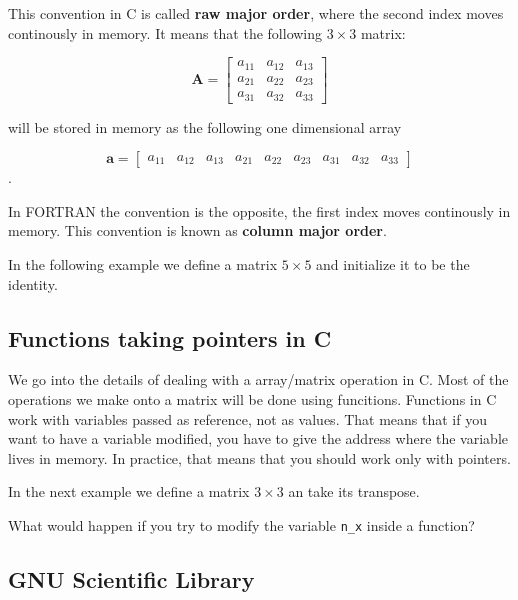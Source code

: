 \documentclass{article}
\begin{document}
This convention in C is called {\bf raw major order}, where the second index moves continously in memory. It means that the following $3\times 3$ matrix:


\begin{displaymath}
\mathbf{A} = 
\left[
\begin{array}{ccc}
a_{11}  & a_{12} & a_{13}   \\
a_{21}  & a_{22}   & a_{23}  \\
a_{31}  & a_{32} & a_{33}   
\end{array}
\right]
\end{displaymath}

will be stored in memory as the following one dimensional array

\begin{displaymath}
\mathbf{a} = 
\left[
\begin{array}{ccccccccc}
a_{11}  & a_{12} & a_{13}   & a_{21}  & a_{22}   & a_{23}  & a_{31}  & a_{32} & a_{33}   
\end{array}
\right]
\end{displaymath}.

In FORTRAN the convention is the opposite, the first index moves continously in memory. This convention is known as {\bf column major order}. 

In the following example we define a matrix $5\times 5$ and initialize it to be 
the identity.




\subsection{Functions taking pointers in C}
We go into the details of dealing with a array/matrix operation in C. Most of the operations we make onto a matrix will be done using funcitions. Functions in C work with variables passed as reference, not as values. That means that if you want to have a variable modified, you have to give the address where the variable lives in memory. In practice, that means that you should work only with pointers.


In the next example we define a matrix $3\times3$ an take its transpose.



What would happen if you try to modify the variable \verb"n_x" inside a function?

\subsection{GNU Scientific Library}
\end{document}

